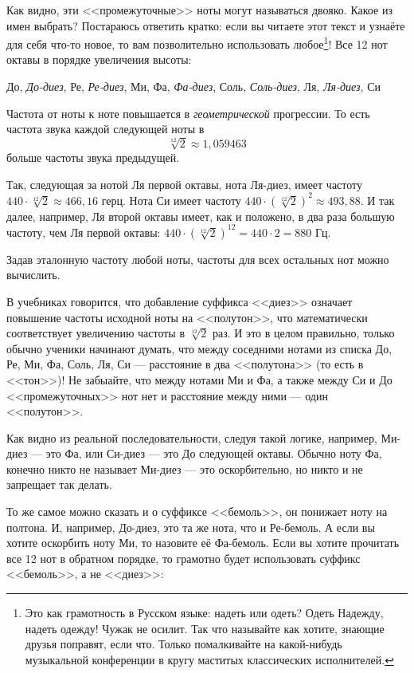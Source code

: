 Как видно, эти <<промежуточные>> ноты могут называться двояко. Какое из имен выбрать? Постараюсь ответить кратко: если вы читаете этот текст и узнаёте для себя что-то новое, то вам позволительно использовать любое\footnote{Это как грамотность в Русском языке: надеть или одеть? Одеть Надежду, надеть одежду! Чужак не осилит. Так что называйте как хотите, знающие друзья поправят, если что. Только помалкивайте на какой-нибудь музыкальной конференции в кругу маститых классических исполнителей.}! Все 12 нот октавы в порядке увеличения высоты:
\begin{center}
    До, \emph{До-диез}, Ре, \emph{Ре-диез}, Ми, Фа, \emph{Фа-диез}, Соль, \emph{Соль-диез}, Ля, \emph{Ля-диез}, Си
\end{center}

Частота от ноты к ноте повышается в \emph{геометрической} прогрессии. То есть частота звука каждой следующей ноты в \[\sqrt[12]{2}\approx 1,059463\] больше частоты звука предыдущей. 

Так, следующая за нотой Ля первой октавы, нота Ля-диез, имеет частоту $440\cdot\sqrt[12]{2}\approx 466,16$ герц. Нота Си имеет частоту $440\cdot(\sqrt[12]{2})^2\approx 493,88$. И так далее, например, Ля второй октавы имеет, как и положено, в два раза большую частоту, чем Ля первой октавы: $440\cdot(\sqrt[12]{2})^{12}=440\cdot 2=880$ Гц.

Задав эталонную частоту любой ноты, частоты для всех остальных нот можно вычислить.

В учебниках говорится, что добавление суффикса <<диез>> означает повышение частоты исходной ноты на <<полутон>>, что математически соответствует увеличению частоты в $\sqrt[12]{2}$ раз. И это в целом правильно, только обычно ученики начинают думать, что между соседними нотами из списка До, Ре, Ми, Фа, Соль, Ля, Си --- расстояние в два <<полутона>> (то есть в <<тон>>)! Не забыайте, что между нотами Ми и Фа, а также между Си и До <<промежуточных>> нот нет и расстояние между ними --- один <<полутон>>. 

Как видно из реальной последовательности, следуя такой логике, например, Ми-диез --- это Фа, или Си-диез --- это До следующей октавы. Обычно ноту Фа, конечно никто не называет Ми-диез --- это оскорбительно, но никто и не запрещает так делать. 

То же самое можно сказать и о суффиксе <<бемоль>>, он понижает ноту на полтона. И, например, До-диез, это та же нота, что и Ре-бемоль. А если вы хотите оскорбить ноту Ми, то назовите её Фа-бемоль. Если вы хотите прочитать все 12 нот в обратном порядке, то грамотно будет использовать суффикс <<бемоль>>, а не <<диез>>:

